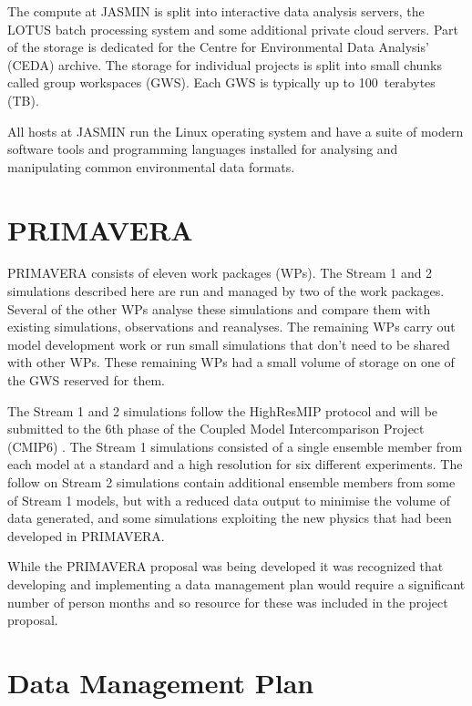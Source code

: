 \documentclass[gmd, manuscript]{copernicus}
\begin{document}
The compute at JASMIN is split into interactive data analysis servers, the LOTUS batch processing system and some additional private cloud servers. Part of the storage is dedicated for the Centre for Environmental Data Analysis' (CEDA) archive. The storage for individual projects is split into small chunks called group workspaces (GWS). Each GWS is typically up to 100~terabytes (TB).

All hosts at JASMIN run the Linux operating system and have a suite of modern software tools and programming languages installed for analysing and manipulating common environmental data formats.

\section{PRIMAVERA}

PRIMAVERA consists of eleven work packages (WPs). The Stream 1 and 2 simulations described here are run and managed by two of the work packages. Several of the other WPs analyse these simulations and compare them with existing simulations, observations and reanalyses. The remaining WPs carry out model development work or run small simulations that don't need to be shared with other WPs. These remaining WPs had a small volume of storage on one of the GWS reserved for them.

The Stream 1 and 2 simulations follow the HighResMIP protocol and will be submitted to the 6th phase of the Coupled Model Intercomparison Project (CMIP6) \citep{Eyring2016}. The Stream 1 simulations consisted of a single ensemble member from each model at a standard and a high resolution for six different experiments. The follow on Stream 2 simulations contain additional ensemble members from some of Stream 1 models, but with a reduced data output to minimise the volume of data generated, and some simulations exploiting the new physics that had been developed in PRIMAVERA.

While the PRIMAVERA proposal was being developed it was recognized that developing and implementing a data management plan would require a significant number of person months and so resource for these was included in the project proposal.


\section{Data Management Plan}

\end{document}
